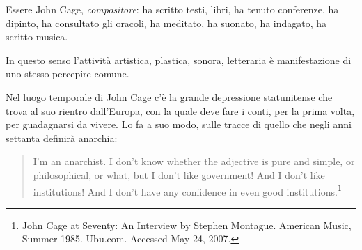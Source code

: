 \begin{multicols}{2}

Essere John Cage, \emph{compositore}: ha scritto testi, libri, ha tenuto conferenze, ha dipinto,
ha consultato gli oracoli, ha meditato, ha suonato, ha indagato, ha scritto musica.


In questo senso l'attivit\`a artistica, plastica, sonora, letteraria \`e manifestazione di uno
stesso percepire comune.

Nel luogo temporale di John Cage c'\`e la grande depressione statunitense che trova al suo rientro dall'Europa,
con la quale deve fare i conti, per la prima volta, per guadagnarsi da vivere. Lo fa a suo modo,
sulle tracce di quello che negli anni settanta definir\`a anarchia:

\begin{quote}
	I'm an anarchist. I don't know whether the adjective is pure and simple, or philosophical, or what, but I don't
	like government! And I don't like institutions! And I don't have any confidence in even good institutions.\footnote{John
		Cage at Seventy: An Interview by Stephen Montague. American Music, Summer 1985. Ubu.com. Accessed May 24, 2007.}
\end{quote}


\end{multicols}
